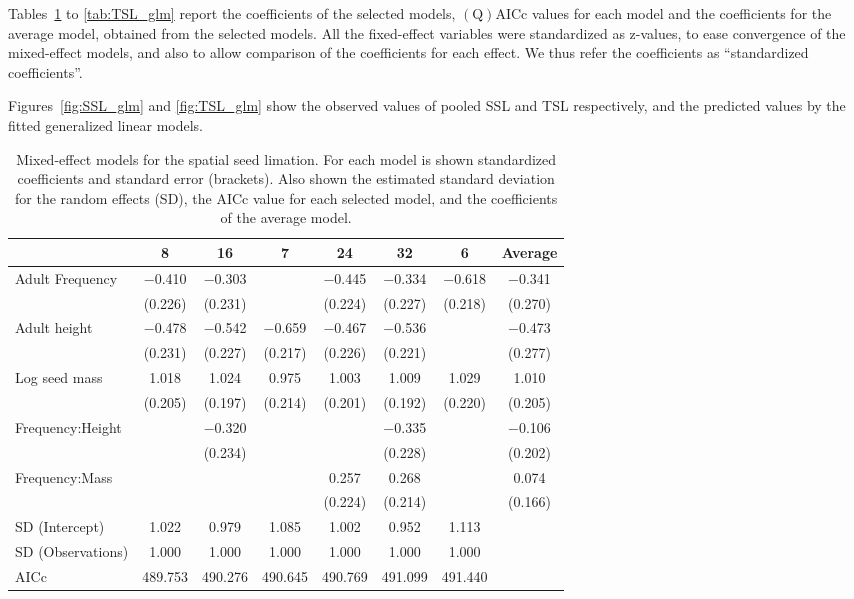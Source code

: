 \documentclass{article}
\begin{document}
Tables~\ref{tab:SSL} to \ref{tab:TSL_glm} report the coefficients of
the selected models, $\mathrm{(Q)AICc}$ values for each model and the
coefficients for the average model, obtained from the selected
models. All the fixed-effect variables were standardized as z-values,
to ease convergence of the mixed-effect models, and also to allow
comparison of the coefficients for each effect. We thus refer the
coefficients as ``standardized coefficients''.

Figures~\ref{fig:SSL_glm} and \ref{fig:TSL_glm} show the observed
values of pooled SSL and TSL respectively, and the
predicted values by the fitted generalized linear models.

%

\begin{table}
\caption{Mixed-effect models for the spatial seed limation. For each
  model is shown standardized coefficients and standard error
  (brackets). Also shown the estimated standard deviation for the
  random effects (SD), the AICc value for each selected model, and the
  coefficients of the average model.}
\centering
\begin{tabular}[t]{lccccccc}
\toprule
  & 8 & 16 & 7 & 24 & 32 & 6 & Average\\
\midrule
Adult Frequency & \num{-0.410} & \num{-0.303} &  & \num{-0.445} & \num{-0.334} & \num{-0.618} & \num{-0.341}\\
 & (\num{0.226}) & (\num{0.231}) &  & (\num{0.224}) & (\num{0.227}) & (\num{0.218}) & (\num{0.270})\\
Adult height & \num{-0.478} & \num{-0.542} & \num{-0.659} & \num{-0.467} & \num{-0.536} &  & \num{-0.473}\\
 & (\num{0.231}) & (\num{0.227}) & (\num{0.217}) & (\num{0.226}) & (\num{0.221}) &  & (\num{0.277})\\
Log seed mass & \num{1.018} & \num{1.024} & \num{0.975} & \num{1.003} & \num{1.009} & \num{1.029} & \num{1.010}\\
 & (\num{0.205}) & (\num{0.197}) & (\num{0.214}) & (\num{0.201}) & (\num{0.192}) & (\num{0.220}) & (\num{0.205})\\
Frequency:Height &  & \num{-0.320} &  &  & \num{-0.335} &  & \num{-0.106}\\
 &  & (\num{0.234}) &  &  & (\num{0.228}) &  & (\num{0.202})\\
Frequency:Mass &  &  &  & \num{0.257} & \num{0.268} &  & \num{0.074}\\
 &  &  &  & (\num{0.224}) & (\num{0.214}) &  & (\num{0.166})\\
SD (Intercept) & \num{1.022} & \num{0.979} & \num{1.085} & \num{1.002} & \num{0.952} & \num{1.113} & \\
SD (Observations) & \num{1.000} & \num{1.000} & \num{1.000} & \num{1.000} & \num{1.000} & \num{1.000} & \\
\midrule
AICc & \num{489.753} & \num{490.276} & \num{490.645} & \num{490.769} & \num{491.099} & \num{491.440} & \\
\bottomrule
\end{tabular}
\label{tab:SSL}
\end{table}
\end{document}

